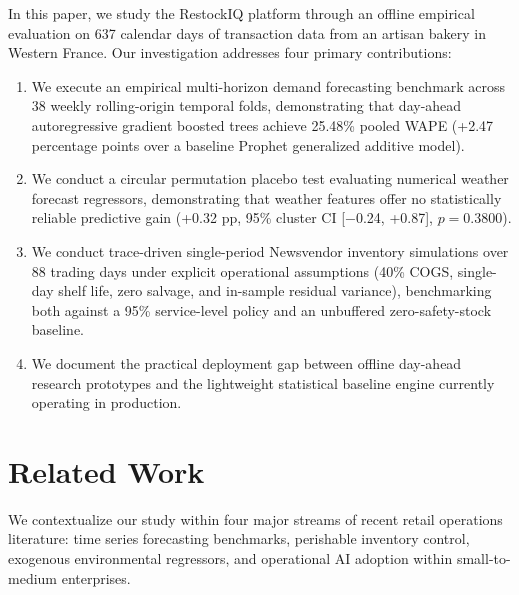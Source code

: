 \documentclass[conference]{IEEEtran}
\begin{document}
In this paper, we study the RestockIQ platform through an offline empirical evaluation on 637 calendar days of transaction data from an artisan bakery in Western France. Our investigation addresses four primary contributions:
\begin{enumerate}
    \item We execute an empirical multi-horizon demand forecasting benchmark across 38 weekly rolling-origin temporal folds, demonstrating that day-ahead autoregressive gradient boosted trees achieve 25.48\% pooled WAPE (+2.47 percentage points over a baseline Prophet generalized additive model).
    \item We conduct a circular permutation placebo test evaluating numerical weather forecast regressors, demonstrating that weather features offer no statistically reliable predictive gain (+0.32 pp, 95\% cluster CI [$-$0.24, +0.87], $p = 0.3800$).
    \item We conduct trace-driven single-period Newsvendor inventory simulations over 88 trading days under explicit operational assumptions (40\% COGS, single-day shelf life, zero salvage, and in-sample residual variance), benchmarking both against a 95\% service-level policy and an unbuffered zero-safety-stock baseline.
    \item We document the practical deployment gap between offline day-ahead research prototypes and the lightweight statistical baseline engine currently operating in production.
\end{enumerate}

\section{Related Work}
\label{sec:related}
We contextualize our study within four major streams of recent retail operations literature: time series forecasting benchmarks, perishable inventory control, exogenous environmental regressors, and operational AI adoption within small-to-medium enterprises.
\end{document}
